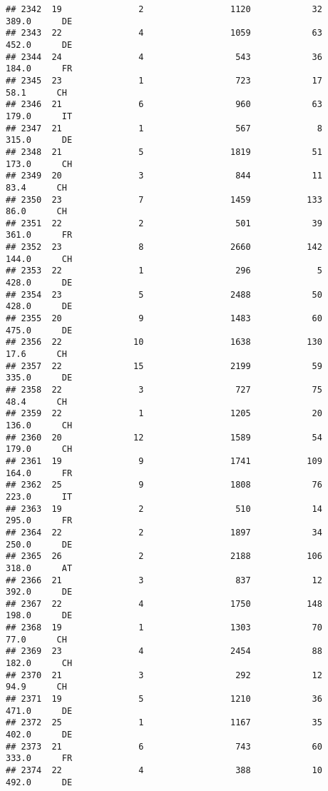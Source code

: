 \documentclass[
]{article}
\begin{document}
\begin{verbatim}
## 2342  19               2                 1120            32    389.0      DE
## 2343  22               4                 1059            63    452.0      DE
## 2344  24               4                  543            36    184.0      FR
## 2345  23               1                  723            17     58.1      CH
## 2346  21               6                  960            63    179.0      IT
## 2347  21               1                  567             8    315.0      DE
## 2348  21               5                 1819            51    173.0      CH
## 2349  20               3                  844            11     83.4      CH
## 2350  23               7                 1459           133     86.0      CH
## 2351  22               2                  501            39    361.0      FR
## 2352  23               8                 2660           142    144.0      CH
## 2353  22               1                  296             5    428.0      DE
## 2354  23               5                 2488            50    428.0      DE
## 2355  20               9                 1483            60    475.0      DE
## 2356  22              10                 1638           130     17.6      CH
## 2357  22              15                 2199            59    335.0      DE
## 2358  22               3                  727            75     48.4      CH
## 2359  22               1                 1205            20    136.0      CH
## 2360  20              12                 1589            54    179.0      CH
## 2361  19               9                 1741           109    164.0      FR
## 2362  25               9                 1808            76    223.0      IT
## 2363  19               2                  510            14    295.0      FR
## 2364  22               2                 1897            34    250.0      DE
## 2365  26               2                 2188           106    318.0      AT
## 2366  21               3                  837            12    392.0      DE
## 2367  22               4                 1750           148    198.0      DE
## 2368  19               1                 1303            70     77.0      CH
## 2369  23               4                 2454            88    182.0      CH
## 2370  21               3                  292            12     94.9      CH
## 2371  19               5                 1210            36    471.0      DE
## 2372  25               1                 1167            35    402.0      DE
## 2373  21               6                  743            60    333.0      FR
## 2374  22               4                  388            10    492.0      DE

\end{verbatim}
\end{document}
